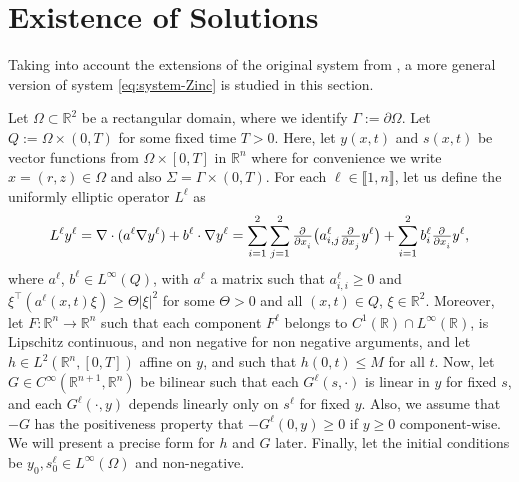 \documentclass[11pt]{article}
\newcommand{\R}{\mathbb{R}}
\newcommand{\llb}{\llbracket}
\newcommand{\rrb}{\rrbracket}
\numberwithin{equation}{section}
\begin{document}
\newpage
\section{Existence of Solutions}
\label{sec:Existence}

Taking into account the extensions of the original system from \cite{Ptashnyk-2011}, a more general version of system \eqref{eq:system-Zinc} is studied in this section. 

Let \(\Omega \subset \R^2\) be a rectangular domain, where we identify \(\Gamma := \partial \Omega\). Let \( Q := \Omega \times (0,T)\) for some fixed time \(T >0\).
Here, let \(y(x,t)\) and \(s(x,t)\) be vector functions from \(\Omega \times [0,T]\) in \(\R^{n}\) where for convenience we write \( x = (r,z) \in \Omega\) and also \(\Sigma = \Gamma \times (0,T)\). For each \(\ell \in \llb1,n\rrb\), let us define the uniformly elliptic operator \(L^\ell\) as
\[
	L^\ell y^\ell = \nabla \cdot (a^\ell \nabla y^\ell) + b^\ell \cdot \nabla y^\ell
	= \sum_{i=1}^{2}  \sum_{j=1}^2 \pd{ }{x_i} \big( a_{i,j}^\ell \pd{ }{x_j} y^\ell \big) + \sum_{i=1}^2 b_i^\ell \pd{ }{x_i} y^\ell,
\]
where \(a^\ell\), \(b^\ell \in L^\infty (Q)\), with \(a^\ell\) a matrix such that \(a^\ell_{i,i} \geq 0\) and
\(
	\xi^\top (a^\ell (x,t) \xi) \geq \Theta |\xi|^2
\)
for some \(\Theta > 0\) and all \((x,t) \in Q\), \( \xi \in \R^2\).
%
Moreover, let \(F: \R^n \to \R^n\) such that each component \( F^\ell \) belongs to \( C^1 (\R) \cap L^\infty (\R)\), is Lipschitz continuous, and non negative for non negative arguments, and let \(h\in L^2 (\R^n,[0,T]) \) affine on \(y\), and such that \(h(0,t) \leq M \) for all \(t\).
Now, let \(G \in C^\infty(\R^{n+1}, \R^n)\) be bilinear such that each \( G^\ell(s,\cdot)\) is linear in \( y\) for fixed \(s\), and each \( G^\ell (\cdot, y)\) depends linearly only on \( s^\ell\) for fixed \(y\). Also, we assume that \(-G\) has the positiveness property that \(-G^\ell (0, y) \geq 0\) if \( y\geq 0\) component-wise. We will present a precise form for \(h\) and \(G\) later.
Finally, let the initial conditions be \( y_0, s_0^\ell \in L^\infty (\Omega)\) and non-negative.
\end{document}
